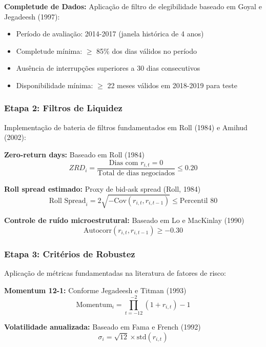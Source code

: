 \textbf{Completude de Dados:} Aplicação de filtro de elegibilidade baseado em Goyal e Jegadeesh (1997):
\begin{itemize}
    \item Período de avaliação: 2014-2017 (janela histórica de 4 anos)
    \item Completude mínima: $\geq$ 85\% dos dias válidos no período
    \item Ausência de interrupções superiores a 30 dias consecutivos
    \item Disponibilidade mínima: $\geq$ 22 meses válidos em 2018-2019 para teste
\end{itemize}

\subsubsection{Etapa 2: Filtros de Liquidez}

Implementação de bateria de filtros fundamentados em Roll (1984) e Amihud (2002):

\textbf{Zero-return days:} Baseado em Roll (1984)
\begin{equation}
ZRD_i = \frac{\text{Dias com } r_{i,t} = 0}{\text{Total de dias negociados}} \leq 0.20
\end{equation}

\textbf{Roll spread estimado:} Proxy de bid-ask spread (Roll, 1984)
\begin{equation}
\text{Roll Spread}_i = 2\sqrt{-\text{Cov}(r_{i,t}, r_{i,t-1})} \leq \text{Percentil 80}
\end{equation}

\textbf{Controle de ruído microestrutural:} Baseado em Lo e MacKinlay (1990)
\begin{equation}
\text{Autocorr}(r_{i,t}, r_{i,t-1}) \geq -0.30
\end{equation}

\subsubsection{Etapa 3: Critérios de Robustez}

Aplicação de métricas fundamentadas na literatura de fatores de risco:

\textbf{Momentum 12-1:} Conforme Jegadeesh e Titman (1993)
\begin{equation}
\text{Momentum}_{i} = \prod_{t=-12}^{-2}(1 + r_{i,t}) - 1
\end{equation}

\textbf{Volatilidade anualizada:} Baseado em Fama e French (1992)
\begin{equation}
\sigma_{i} = \sqrt{12} \times \text{std}(r_{i,t})
\end{equation}


